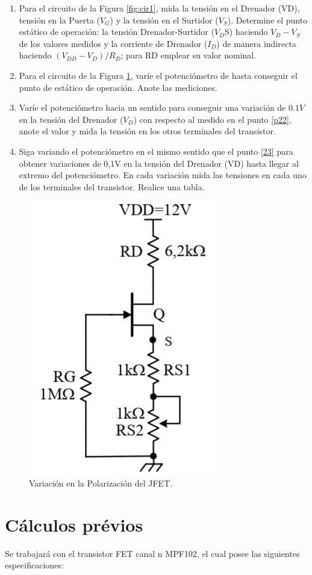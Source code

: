 \documentclass[12pt, a4paper]{article}
\begin{document}
    \begin{enumerate}
        \item \label{p21}	Para el circuito de la Figura \ref{fig:cir1}, mida la tensión en el Drenador (VD), tensión en la Puerta ($V_G$) y la tensión en el Surtidor ($V_S$). Determine el punto estático de operación: la tensión Drenador-Surtidor ($V_D$S) haciendo $V_D-V_S$ de los valores medidos y la corriente de Drenador ($I_D$) de manera indirecta haciendo $(V_{DD}-V_D)/R_D$; para RD emplear su valor nominal.
        \item \label{p22}	Para el circuito de la Figura \ref{fig:cir2}, varíe el potenciómetro de hasta conseguir el punto de estático de operación. Anote las mediciones.
        \item \label{p23} 	Varíe el potenciómetro hacia un sentido para conseguir una variación de $0.1V$ en la tensión del Drenador ($V_D$) con respecto al medido en el punto \ref{p22}, anote el valor y mida la tensión en los otros terminales del transistor.
        \item \label{p24} 	Siga variando el potenciómetro en el mismo sentido que el punto \ref{23} para obtener variaciones de 0,1V en la tensión del Drenador (VD) hasta llegar al extremo del potenciómetro. En cada variación mida las tensiones en cada uno de los terminales del transistor. Realice una tabla.
    \end{enumerate}

    \begin{figure}[h!]
        \centering
        \includegraphics[height=5cm\textwidth]{circuito2.jpg}
        \caption{Variación en la Polarización del JFET.}
        \label{fig:cir2}
    \end{figure}

    \newpage

    \section{Cálculos prévios}

    Se trabajará con el transistor FET canal n MPF102, el cual posee las siguientes especificaciones:
    
\end{document}
